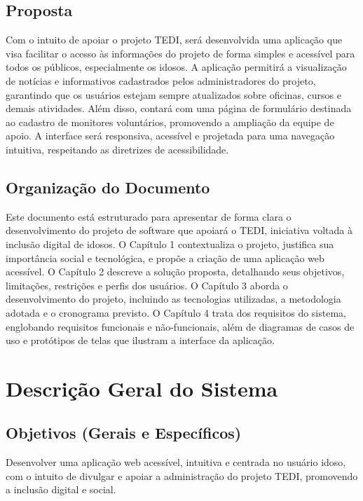 \documentclass[a4paper,12pt]{article}
\begin{document}
\subsection{Proposta}
Com o intuito de apoiar o projeto TEDI, será desenvolvida uma aplicação que visa facilitar o acesso às informações do projeto de forma simples e acessível para todos os públicos, especialmente os idosos. A aplicação permitirá a visualização de notícias e informativos cadastrados pelos administradores do projeto, garantindo que os usuários estejam sempre atualizados sobre oficinas, cursos e demais atividades. Além disso, contará com uma página de formulário destinada ao cadastro de monitores voluntários, promovendo a ampliação da equipe de apoio. A interface será responsiva, acessível e projetada para uma navegação intuitiva, respeitando as diretrizes de acessibilidade.


\subsection{Organização do Documento}

Este documento está estruturado para apresentar de forma clara o desenvolvimento do projeto de software que apoiará o TEDI, iniciativa voltada à inclusão digital de idosos. O Capítulo 1 contextualiza o projeto, justifica sua importância social e tecnológica, e propõe a criação de uma aplicação web acessível. O Capítulo 2 descreve a solução proposta, detalhando seus objetivos, limitações, restrições e perfis dos usuários. O Capítulo 3 aborda o desenvolvimento do projeto, incluindo as tecnologias utilizadas, a metodologia adotada e o cronograma previsto. O Capítulo 4 trata dos requisitos do sistema, englobando requisitos funcionais e não-funcionais, além de diagramas de casos de uso e protótipos de telas que ilustram a interface da aplicação.

\newpage
\section{Descrição Geral do Sistema}
\subsection{Objetivos (Gerais e Específicos)}

Desenvolver uma aplicação web acessível, intuitiva e centrada no usuário idoso, com o intuito de divulgar e apoiar a administração do projeto TEDI, promovendo a inclusão digital e social.
\end{document}
